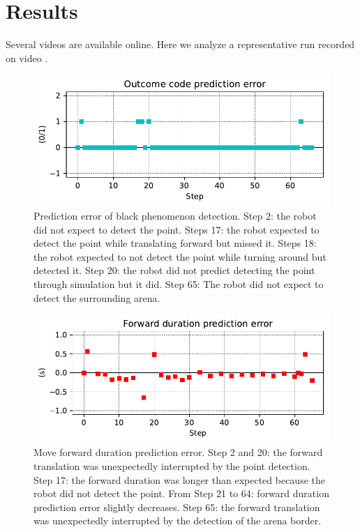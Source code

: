 \documentclass[runningheads]{llncs}
\begin{document}


\section{Results}

Several videos are available online. 
Here we analyze a representative run recorded on video \cite{georgeon_petitcat_2024}.

\begin{figure}
	\includegraphics[width=\textwidth]{01_Outcome_code.pdf}
	\caption{Prediction error of black phenomenon detection.
	Step 2: the robot did not expect to detect the point.
	Steps 17: the robot expected to detect the point while translating forward but missed it.
	Steps 18: the robot expected to not detect the point while turning around but detected it.
	Step 20: the robot did not predict detecting the point through simulation but it did. 
	Step 65: The robot did not expect to detect the surrounding arena. } \label{fig:yaw_pe}
\end{figure}

\begin{figure}
	\includegraphics[width=\textwidth]{07_Forward_duration_pe.pdf}
	\caption{Move forward duration prediction error.
	Step 2 and 20: the forward translation was unexpectedly interrupted by the point detection.
	Step 17: the forward duration was longer than expected because the robot did not detect the point.
	From Step 21 to 64: forward duration prediction error slightly decreases. 
	Step 65: the forward translation was unexpectedly interrupted by the detection of the arena border.} \label{fig:yaw_re}
\end{figure}
\end{document}
